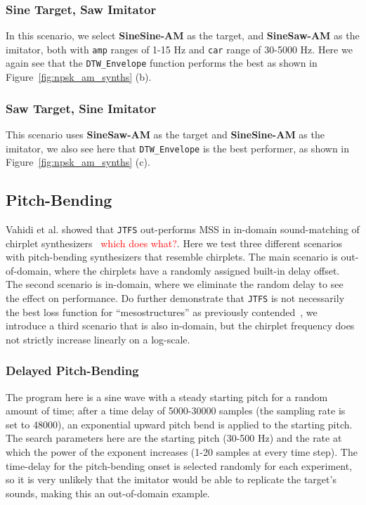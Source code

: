 \documentclass{article} %
\newcommand{\todo}[1]{\textcolor{red}{#1}}
\newcommand{\JTFS}{\texttt{JTFS}\xspace}
\newcommand{\DTWEnv}{\texttt{DTW\_Envelope}\xspace}
\newcommand{\FMMod}{\textbf{SineSaw-AM}\xspace}
\newcommand{\FMModvtwo}{\textbf{SineSine-AM}\xspace}
\begin{document}
\subsubsection{Sine Target, Saw Imitator}
\label{sec:am_sinetarget_sawimitate}
In this scenario, we select \FMModvtwo as the target, and \FMMod as the imitator, both with \texttt{amp} ranges of 1-15 Hz and \texttt{car} range of 30-5000 Hz. Here we again see that the \DTWEnv function performs the best as shown in Figure~\ref{fig:npsk_am_synths} (b).


\subsubsection{Saw Target, Sine Imitator}
\label{sec:am_sawtarget_sineimitate}
This scenario uses \FMMod as the target and \FMModvtwo as the imitator, we also see here that \DTWEnv is the best performer, as shown in Figure~\ref{fig:npsk_am_synths} (c).



\subsection{Pitch-Bending}
Vahidi et al. showed that \JTFS out-performs MSS in in-domain sound-matching of chirplet synthesizers~\cite{vahidi2023mesostructures} \todo{which does what?}. Here we test three different scenarios with pitch-bending synthesizers that resemble chirplets. The main scenario is out-of-domain, where the chirplets have a randomly assigned built-in delay offset. The second scenario is in-domain, where we eliminate the random delay to see the effect on performance. Do further demonstrate that \JTFS is not necessarily the best loss function for ``mesostructures'' as previously contended~\cite{vahidi2023mesostructures}, we introduce a third scenario that is also in-domain, but the chirplet frequency does not strictly increase linearly on a log-scale.


\subsubsection{Delayed Pitch-Bending}
The program here is a sine wave with a steady starting pitch for a random amount of time; after a time delay of 5000-30000 samples (the sampling rate is set to 48000), an exponential upward pitch bend is applied to the starting pitch. The search parameters here are the starting pitch (30-500 Hz) and the rate at which the power of the exponent increases (1-20 samples at every time step). The time-delay for the pitch-bending onset is selected randomly for each experiment, so it is very unlikely that the imitator would be able to replicate the target's sounds, making this an out-of-domain example.
\end{document}

